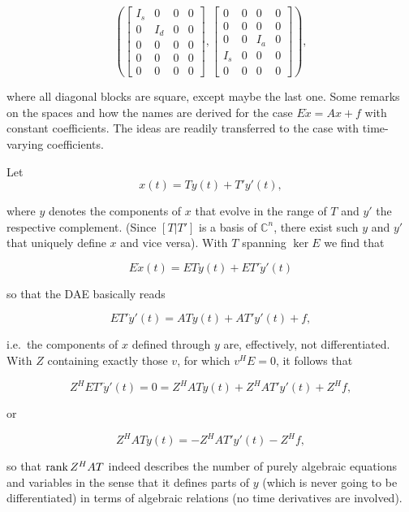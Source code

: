 \documentclass[]{book}
\theoremstyle{definition}
\theoremstyle{definition}
\theoremstyle{definition}
\theoremstyle{remark}
\begin{document}
\begin{equation}
\left(\begin{bmatrix}
I_s & 0 & 0 & 0 \\
0 & I_d & 0 & 0 \\
0 & 0 & 0 & 0 \\
0 & 0 & 0 & 0 \\
0 & 0 & 0 & 0
\end{bmatrix},
\begin{bmatrix}
0 & 0 & 0 & 0  \\
0 & 0 & 0 & 0  \\
0 & 0 & I_a & 0 \\
I_s & 0 & 0 & 0 \\
0 & 0 & 0 & 0
\end{bmatrix}\right),
\label{eq:local-canonical-form}
\end{equation}

where all diagonal blocks are square, except maybe the last one.
 Some remarks on the spaces and how the names are
derived for the case \(E\dot x = Ax +f\) with constant coefficients. The
ideas are readily transferred to the case with time-varying
coefficients.

Let \[x(t) = Ty(t) + T'y'(t),\]

where \(y\) denotes the components of \(x\) that evolve in the range of
\(T\) and \(y'\) the respective complement. (Since \([T|T']\) is a basis
of \(\mathbb C^{n}\), there exist such \(y\) and \(y'\) that uniquely
define \(x\) and vice versa). With \(T\) spanning \(\ker E\) we find
that

\[E \dot x(t) = ET\dot y(t) + ET'\dot y'(t)\]

so that the DAE basically reads

\[ET'\dot y'(t) = ATy(t) + AT'y'(t)+f,\]

i.e.~the components of \(x\) defined through \(y\) are, effectively, not
differentiated. With \(Z\) containing exactly those \(v\), for which
\(v^HE=0\), it follows that

\[Z^HET'\dot y'(t) = 0 = Z^HATy(t) + Z^HAT'y'(t)+Z^Hf,\]

or

\[Z^HATy(t) = -Z^HAT'y'(t)-Z^Hf,\]

so that \(\operatorname{rank} Z^HAT\) indeed describes the number of purely algebraic
equations and variables in the sense that it defines parts of \(y\)
(which is never going to be differentiated) in terms of algebraic
relations (no time derivatives are involved).
\end{document}
